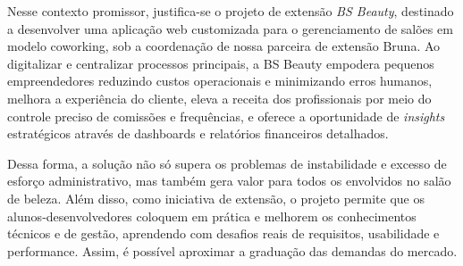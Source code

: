 Nesse contexto promissor, justifica-se o projeto de extensão \emph{BS Beauty}, destinado a desenvolver uma aplicação web customizada para o gerenciamento de salões em modelo coworking, sob a coordenação de nossa parceira de extensão Bruna. Ao digitalizar e centralizar processos principais, a BS Beauty empodera pequenos empreendedores reduzindo custos operacionais e minimizando erros humanos, melhora a experiência do cliente, eleva a receita dos profissionais por meio do controle preciso de comissões e frequências, e oferece a oportunidade de \emph{insights} estratégicos através de dashboards e relatórios financeiros detalhados. 

Dessa forma, a solução não só supera os problemas de instabilidade e excesso de esforço administrativo, mas também gera valor para todos os envolvidos no salão de beleza. Além disso, como iniciativa de extensão, o projeto permite que os alunos‐desenvolvedores coloquem em prática e melhorem os conhecimentos técnicos e de gestão,  aprendendo com desafios reais de requisitos, usabilidade e performance. Assim, é possível aproximar a graduação das demandas do mercado.


